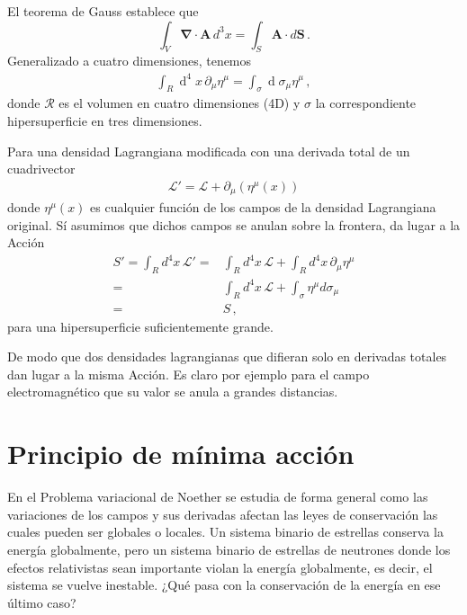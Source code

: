 \begin{frame}
El teorema de Gauss establece que
\begin{equation}
\int_V\boldsymbol{\nabla}\cdot\mathbf{A}\,d^3x=
 \int_S\mathbf{A}\cdot d\mathbf{S}\,.
\end{equation}
Generalizado a cuatro dimensiones, tenemos
\begin{align}
  \label{eq:gauss4d}
\int_{R} \operatorname{d}^4x\,\partial_{\mu} \eta^{\mu}=
\int_{\sigma} \operatorname{d}\sigma_{\mu} \eta^{\mu}\,,   
\end{align}
donde $\mathcal{R}$ es el volumen en cuatro dimensiones (4D) y $\sigma$ la correspondiente hipersuperficie en tres dimensiones.
\end{frame}

\begin{frame}
Para una densidad Lagrangiana modificada con una derivada total de un cuadrivector
\begin{align}
  \mathcal{L}'=\mathcal{L}+\partial_\mu(\eta^{\mu}(x))
\end{align}
donde $\eta^{\mu}(x)$ es cualquier función de los campos de la densidad Lagrangiana original. Sí asumimos que dichos campos se anulan  sobre la frontera, da lugar a la Acción
\begin{align}
  S'=\int_{R}d^4x\,\mathcal{L}'=&\int_{R}d^4x\,\mathcal{L}+\int_R d^4x\,\partial_\mu\eta^{\mu}\nonumber\\
  =&\int_{R}d^4x\,\mathcal{L}+\int_\sigma \eta^{\mu} d\sigma_{\mu}\nonumber\\
  =&S\,,
\end{align}
para una hipersuperficie suficientemente grande.
\end{frame}
De modo que dos densidades lagrangianas que difieran solo en derivadas totales dan lugar a la misma Acción. Es claro por ejemplo para el campo electromagnético que su valor se anula a grandes distancias.

\section{Principio de mínima acción}
\label{sec:principio-de-minima-call}


En el Problema variacional de Noether se estudia de forma general como las variaciones de los campos y sus derivadas afectan las leyes de conservación las cuales pueden ser globales o locales. Un sistema binario de estrellas conserva la energía globalmente, pero un sistema binario de estrellas de neutrones donde los efectos relativistas sean importante violan la energía globalmente, es decir, el sistema se vuelve inestable. ¿Qué pasa con la conservación de la energía en ese último caso?



